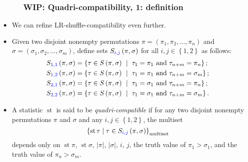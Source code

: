\documentclass{beamer}
\newcommand{\blue}{\color{blue}}
\newcommand{\st}{\operatorname{st}}
\newcommand{\fti}[1]{\frametitle{\ \ \ \ \ #1}}
\newcommand{\set}[1]{\left\{ #1 \right\}}
\newcommand{\abs}[1]{\left| #1 \right|}
\newcommand{\tup}[1]{\left( #1 \right)}
\newcommand{\defn}[1]{{\color{darkred}\emph{#1}}} %
\theoremstyle{plain}
\begin{document}
\begin{frame}
\fti{WIP: Quadri-compatibility, 1: definition}

\begin{itemize}

\item We can refine LR-shuffle-compatibility even further.

\item Given two disjoint nonempty permutations
      $\pi = \tup{\pi_1, \pi_2, \ldots, \pi_n}$ and
      $\sigma = \tup{\sigma_1, \sigma_2, \ldots, \sigma_m}$,
      define sets $S_{\blue i, j} \tup{\pi, \sigma}$ for all
      $i, j \in \set{1, 2}$ as follows:
      \begin{align*}
      S_{\blue 1, 1} \tup{\pi, \sigma} &= \set{ \tau \in S \tup{\pi, \sigma} \  \mid \  \tau_1 = \pi_1 \text{ and } \tau_{n+m} = \pi_n }; \\
      S_{\blue 1, 2} \tup{\pi, \sigma} &= \set{ \tau \in S \tup{\pi, \sigma} \  \mid \  \tau_1 = \pi_1 \text{ and } \tau_{n+m} = \sigma_m }; \\
      S_{\blue 2, 1} \tup{\pi, \sigma} &= \set{ \tau \in S \tup{\pi, \sigma} \  \mid \  \tau_1 = \sigma_1 \text{ and } \tau_{n+m} = \pi_n }; \\
      S_{\blue 2, 2} \tup{\pi, \sigma} &= \set{ \tau \in S \tup{\pi, \sigma} \  \mid \  \tau_1 = \sigma_1 \text{ and } \tau_{n+m} = \sigma_m }.
      \end{align*}

\pause 
\item A statistic $\st$ is said to be \defn{quadri-compatible}
      if for any two disjoint nonempty permutations $\pi$ and $\sigma$
      and any $i, j \in \set{1, 2}$,
      the multiset
      \[
      \set{ \st\tau \mid \tau\in S_{\blue i, j} \tup{\pi, \sigma} }_{\text{multiset}}
      \]
      depends only on $\st \pi$, $\st \sigma$, $\abs{\pi}$,
      $\abs{\sigma}$, {\blue $i$, $j$, the truth value of $\pi_1 > \sigma_1$,
      and the truth value of $\pi_n > \sigma_m$}.

\end{itemize}

\end{frame}
\end{document}
